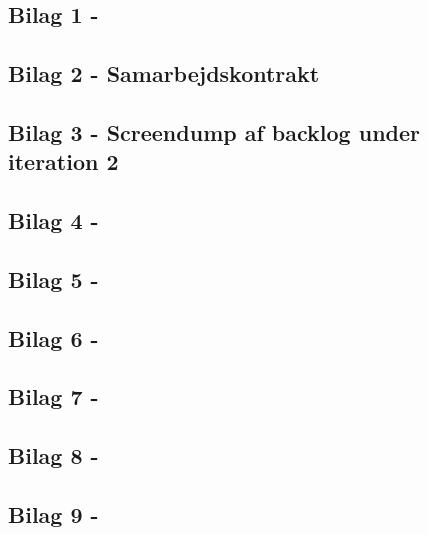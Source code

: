 \begin{appendices}
\subsection*{Bilag 1 - }\label{Bilag1}

\subsection*{Bilag 2 - Samarbejdskontrakt}\label{Bilag2}

\subsection*{Bilag 3 - Screendump af backlog under iteration 2}\label{Bilag3}

\subsection*{Bilag 4 - }\label{Bilag4}

\subsection*{Bilag 5 - }\label{Bilag5}

\subsection*{Bilag 6 - }\label{Bilag6}

\subsection*{Bilag 7 - }\label{Bilag7}

\subsection*{Bilag 8 - }\label{Bilag8}

\subsection*{Bilag 9 - }\label{Bilag9}


\end{appendices}

